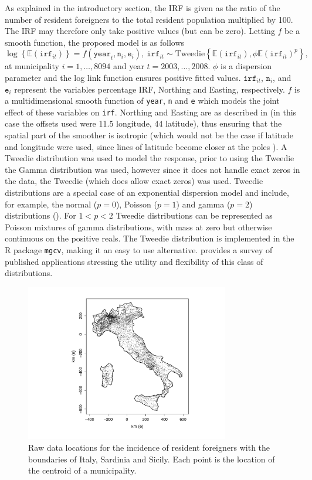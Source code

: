 As explained in the introductory section, the IRF is given as the ratio of the number of resident foreigners to the total resident population multiplied by 100. The IRF may therefore only take positive values (but can be zero). Letting $f$ be a smooth function, the proposed model is as follows
\begin{equation}
\log \left\{\mathbb{E}(\texttt{irf}_{it})\right\} = f(\texttt{year}_t,\texttt{n}_i,\texttt{e}_i), \ \texttt{irf}_{it} \sim \text{Tweedie}\left\{\mathbb{E}(\texttt{irf}_{it}),\phi \mathbb{E}(\texttt{irf}_{it})^{p}\right\},          
\label{PropM}
\end{equation}
at municipality $i=1,\ldots,8094$ and year $t=2003,\ldots,2008$. $\phi$ is a dispersion parameter and the log link function ensures positive fitted values. $\texttt{irf}_{it}$, $\texttt{n}_i$, and $\texttt{e}_i$ represent the variables percentage IRF, Northing and Easting, respectively. $f$ is a multidimensional smooth function of \texttt{year}, \texttt{n} and \texttt{e} which models the joint effect of these variables on \texttt{irf}. Northing and Easting are as described in  (in this case the offsets used were 11.5 longitude, 44 latitude), thus ensuring that the spatial part of the smoother is isotropic (which would not be the case if latitude and longitude were used, since lines of latitude become closer at the poles \label{cor-r21}). A Tweedie distribution was used to model the response, prior to using the Tweedie the Gamma distribution was used, however since it does not handle exact zeros in the data, the Tweedie (which does allow exact zeros) was used.\label{cor-r20} Tweedie distributions are a special case of an exponential dispersion model and include, for example, the normal ($p=0$), Poisson ($p=1$) and gamma ($p=2$) distributions (\cite{Jorgensen}). For $1<p<2$ Tweedie distributions can be represented as Poisson mixtures of gamma distributions, with mass at zero but otherwise continuous on the positive reals. The Tweedie distribution is implemented in the \textsf{R} package \texttt{mgcv}, making it an easy to use alternative.  provides a survey of published applications stressing the utility and flexibility of this class of distributions. 

\begin{figure}[tb]
	\centering
		\includegraphics[width=3.5in]{it/pointmap.pdf}
	\caption{Raw data locations for the incidence of resident foreigners with the boundaries of Italy, Sardinia and Sicily. Each point is the location of the centroid of a municipality.}
	\label{pointmap}
\end{figure}

